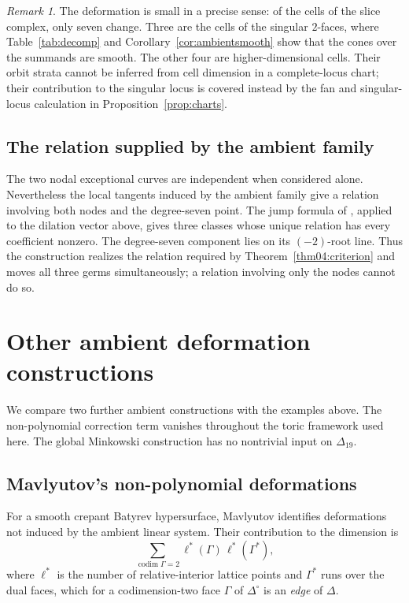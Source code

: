 \documentclass[11pt]{amsart}
\theoremstyle{definition}
\theoremstyle{remark}
\newtheorem{remark}[theorem]{Remark}
\theoremstyle{plain}
\begin{document}
\begin{remark}\label{rem:sevencells}
The deformation is small in a precise sense: of the cells of the slice complex,
only seven change.  Three are the cells of the singular $2$-faces, where
Table~\ref{tab:decomp} and Corollary~\ref{cor:ambientsmooth} show that the cones
over the summands are smooth.  The other four are higher-dimensional cells.
Their orbit strata cannot be inferred from cell dimension in a complete-locus
chart; their contribution to the singular locus is covered instead by the fan and singular-locus calculation in
Proposition~\ref{prop:charts}.
\end{remark}

\subsection{The relation supplied by the ambient family}
The two nodal exceptional curves are independent when considered
alone.  Nevertheless the local tangents induced by the ambient family
give a relation involving both nodes and the degree-seven point.
The jump formula of \cite[Prop.~8.2]{PaperIV}, applied to the dilation
vector above, gives three classes whose unique relation has every
coefficient nonzero.  The degree-seven component lies on its
$(-2)$-root line.  Thus the construction realizes the relation required
by Theorem~\ref{thm04:criterion} and moves all three germs
simultaneously; a relation involving only the nodes cannot do so.

\appendix

\section{Other ambient deformation constructions}\label{sec:empty}

We compare two further ambient constructions with the examples above.
The non-polynomial correction term vanishes throughout the toric
framework used here.  The global Minkowski construction has no
nontrivial input on $\Delta_{19}$.

\subsection{Mavlyutov's non-polynomial deformations}
For a smooth crepant Batyrev hypersurface, Mavlyutov
\cite{Mav04,Mav05} identifies deformations not induced by the ambient
linear system.  Their contribution to the dimension is
\begin{equation}\label{eq:mav}
  \sum_{\operatorname{codim}\Gamma = 2} \ell^*(\Gamma)\,\ell^*(\Gamma^*),
\end{equation}
where $\ell^*$ is the number of relative-interior lattice points and $\Gamma^*$
runs over the dual faces, which for a codimension-two face $\Gamma$ of
$\Delta^\circ$ is an \emph{edge} of $\Delta$.
\end{document}

